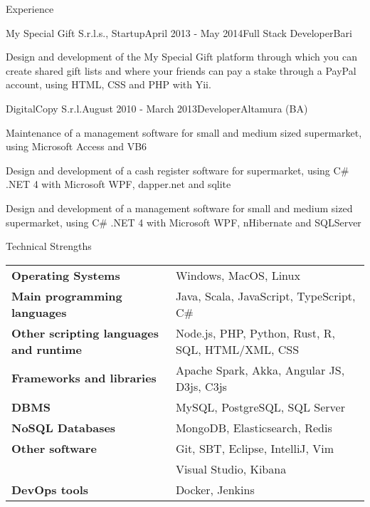 \documentclass{resume} %
\begin{document}
\begin{rSection}{Experience}

\begin{rSubsection}{My Special Gift S.r.l.s., Startup}{April 2013 - May 2014}{Full Stack Developer}{Bari}
\item Design and development of the My Special Gift platform through which you can create shared gift lists and where your friends can pay a stake through a PayPal account, using HTML, CSS and PHP with Yii.
\end{rSubsection}


\begin{rSubsection}{DigitalCopy S.r.l.}{August 2010 - March 2013}{Developer}{Altamura (BA)}
\item Maintenance of a management software for small and medium sized supermarket, using Microsoft Access and VB6
\item Design and development of a cash register software for supermarket, using C\# .NET 4 with Microsoft WPF, dapper.net and sqlite
\item Design and development of a management software for small and medium sized supermarket, using C\# .NET 4 with Microsoft WPF, nHibernate and SQLServer
\end{rSubsection}

\end{rSection}


\begin{rSection}{Technical Strengths}

\begin{tabular}{ @{} >{\bfseries}l @{\hspace{6ex}} l }
Operating Systems & Windows, MacOS, Linux \\
Main programming languages & Java, Scala, JavaScript, TypeScript, C\# \\
Other scripting languages and runtime & Node.js, PHP, Python, Rust, R, SQL, HTML/XML, CSS \\
Frameworks and libraries & Apache Spark, Akka, Angular JS, D3js, C3js \\
DBMS & MySQL, PostgreSQL, SQL Server \\
NoSQL Databases & MongoDB, Elasticsearch, Redis \\
Other software & Git, SBT, Eclipse, IntelliJ, Vim \\
& Visual Studio, Kibana \\
DevOps tools & Docker, Jenkins \\
\end{tabular}

\end{rSection}
\end{document}
